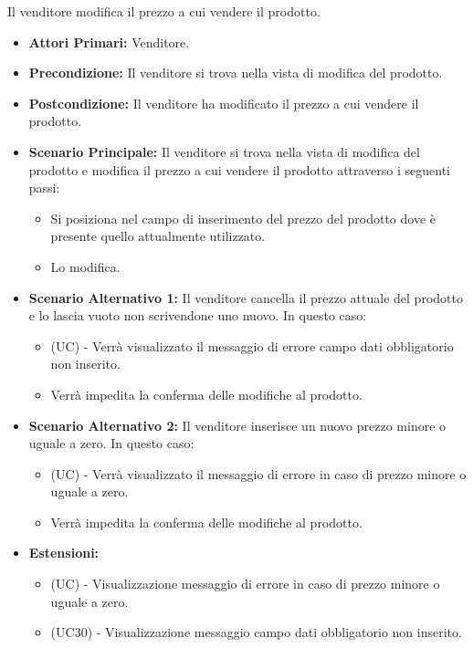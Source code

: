 Il venditore modifica il prezzo a cui vendere il prodotto.
\begin{itemize}
    \item \textbf{Attori Primari:} Venditore.
    \item \textbf{Precondizione:} Il venditore si trova nella vista di modifica del prodotto.
    \item \textbf{Postcondizione:} Il venditore ha modificato il prezzo a cui vendere il prodotto.
    \item \textbf{Scenario Principale:} Il venditore si trova nella vista di modifica del prodotto e modifica il prezzo a cui vendere il prodotto attraverso i seguenti passi:
    \begin{itemize} 
        \item Si posiziona nel campo di inserimento del prezzo del prodotto dove è presente quello attualmente utilizzato.
        \item Lo modifica.
    \end{itemize}
    \item \textbf{Scenario Alternativo 1:} Il venditore cancella il prezzo attuale del prodotto e lo lascia vuoto non scrivendone uno nuovo. In questo caso:
    \begin{itemize}
        \item (UC) - Verrà visualizzato il messaggio di errore campo dati obbligatorio non inserito.
        \item Verrà impedita la conferma delle modifiche al prodotto.
    \end{itemize}
    \item \textbf{Scenario Alternativo 2:} Il venditore inserisce un nuovo prezzo minore o uguale a zero. In questo caso:
    \begin{itemize}
        \item (UC) - Verrà visualizzato il messaggio di errore in caso di prezzo minore o uguale a zero.
        \item Verrà impedita la conferma delle modifiche al prodotto.
    \end{itemize}
    \item \textbf{Estensioni:}
        \begin{itemize}
            \item (UC) - Visualizzazione messaggio di errore in caso di prezzo minore o uguale a zero.
            \item (UC30) - Visualizzazione messaggio campo dati obbligatorio non inserito.
        \end{itemize}
\end{itemize}

